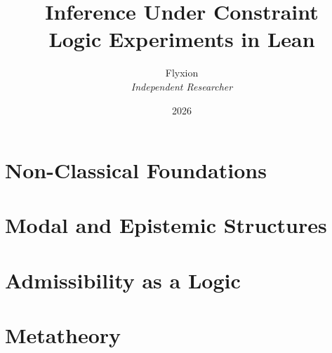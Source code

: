 \documentclass[11pt]{book}
\title{\texorpdfstring{\textbf{Inference Under Constraint}\\[0.3em]
  \large Logic Experiments in Lean}%
  {Inference Under Constraint: Logic Experiments in Lean}}
\author{Flyxion\\\textit{Independent Researcher}}
\date{2026}
\theoremstyle{definition}
\begin{document}
\frontmatter
\maketitle

\tableofcontents

\mainmatter

\part{Non-Classical Foundations}


\part{Modal and Epistemic Structures}


\part{Admissibility as a Logic}


\part{Metatheory}


\backmatter

\end{document}
